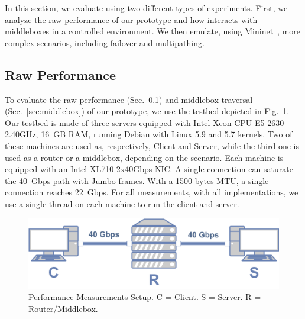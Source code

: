 
In this section, we evaluate \tcpls using two different types of experiments.
First, we analyze the raw performance of our \tcpls prototype and how \tcpls
interacts with middleboxes in a controlled environment. We then emulate, using
Mininet~\cite{handigol2012reproducible}, more complex scenarios, including failover and multipathing.






\subsection{Raw Performance} \label{sec:perf}

To evaluate the raw performance (Sec.~\ref{sec:perf}) and middlebox traversal
(Sec.~\ref{sec:middlebox}) of our \tcpls prototype, we use the testbed depicted
in Fig.~\ref{fig:perf_testbed}. Our testbed is made of three servers equipped
with Intel Xeon CPU E5-2630 2.40GHz, 16~GB RAM, running
Debian with Linux 5.9 and 5.7 kernels. Two of these machines are used as,
respectively, Client and Server, while the third one is used as a router or a
middlebox, depending on the scenario. Each machine is equipped with an Intel
XL710 2x40Gbps NIC. A single \tcp connection can saturate the 40~Gbps path with
Jumbo frames. With a 1500 bytes MTU, a single \tcp connection reaches 22~Gbps.
For all measurements, with all implementations, we use a single thread on each
machine to run the client and server.

\begin{figure}[!t]
  \begin{center}
    \includegraphics[width=.6\columnwidth]{figures/testbed.png}
  \end{center}
  \vspace{-0.5cm}
  \caption{Performance Measurements Setup. C = Client. S = Server. R = Router/Middlebox.}
  \label{fig:perf_testbed}
\end{figure}


